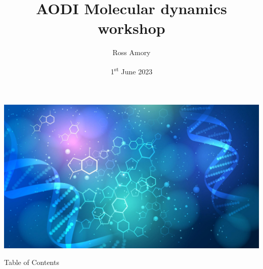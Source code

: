 

\title{AODI Molecular dynamics workshop}
\author{Ross Amory}
\date[1\textsuperscript{st} June 2023]{1\textsuperscript{st} June 2023}



{
{\includegraphics[width=\paperwidth,height=\paperheight]{figures/title_background.jpg}}
\frame{\titlepage}
}
\begin{frame}{Table of Contents}
	\begin{multicols}{2}
		\tableofcontents
	\end{multicols}
\end{frame}







